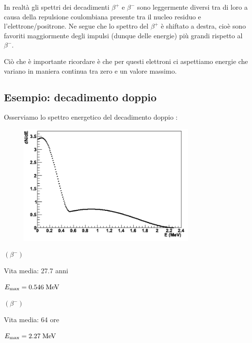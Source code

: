 \vspace{0.2cm}In realtà gli spettri dei decadimenti $\beta^+$ e $\beta^-$ sono leggermente diversi tra di loro a causa della repulsione coulombiana presente tra il nucleo residuo e l'elettrone/positrone. Ne segue che lo spettro del $\beta^+$ è shiftato a destra, cioè sono favoriti maggiormente degli impulsi (dunque delle energie) più grandi rispetto al $\beta^-$.

Ciò che è importante ricordare è che per questi elettroni ci aspettiamo energie che variano in maniera continua tra zero e un valore massimo.


\subsection{Esempio: decadimento doppio \texorpdfstring{}{\textninesuperior\textzerosuperior Sr/\textninesuperior\textzerosuperior Y}}

Osserviamo lo spettro energetico del decadimento doppio :

\begin{minipage}{0.7\textwidth}
    \begin{figure}[H]
        \centering
        \includegraphics[width=9cm]{immagini/decadimento_beta_doppio.png}
    \end{figure}
\end{minipage}
\begin{minipage}{0.3\textwidth}
    
     $(\beta^-)$
    
    \vspace{0.2cm}Vita media: 27.7 anni

    \vspace{0.2cm}$E_{\rm max}=0.546 \; \rm MeV$

    \vspace{0.8cm} $(\beta^-)$
    
    \vspace{0.2cm}Vita media: 64 ore

    \vspace{0.2cm}$E_{\rm max}=2.27 \; \rm MeV$
\end{minipage}

